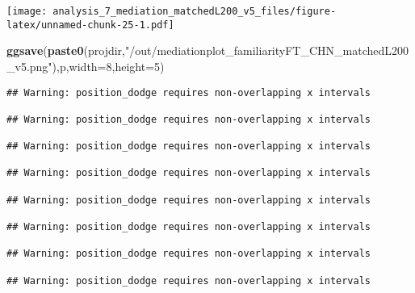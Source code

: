 \documentclass[
]{article}
\newenvironment{Shaded}{\begin{snugshade}}{\end{snugshade}}
\newcommand{\DataTypeTok}[1]{\textcolor[rgb]{0.13,0.29,0.53}{#1}}
\newcommand{\DecValTok}[1]{\textcolor[rgb]{0.00,0.00,0.81}{#1}}
\newcommand{\KeywordTok}[1]{\textcolor[rgb]{0.13,0.29,0.53}{\textbf{#1}}}
\newcommand{\NormalTok}[1]{#1}
\newcommand{\StringTok}[1]{\textcolor[rgb]{0.31,0.60,0.02}{#1}}
\begin{document}
\texttt{[image: analysis\_7\_mediation\_matchedL200\_v5\_files/figure-latex/unnamed-chunk-25-1.pdf]}

\begin{Shaded}
\begin{Highlighting}[]
\KeywordTok{ggsave}\NormalTok{(}\KeywordTok{paste0}\NormalTok{(projdir,}\StringTok{"/out/mediationplot_familiarityFT_CHN_matchedL200_v5.png"}\NormalTok{),p,}\DataTypeTok{width=}\DecValTok{8}\NormalTok{,}\DataTypeTok{height=}\DecValTok{5}\NormalTok{)}
\end{Highlighting}
\end{Shaded}

\begin{verbatim}
## Warning: position_dodge requires non-overlapping x intervals

## Warning: position_dodge requires non-overlapping x intervals

## Warning: position_dodge requires non-overlapping x intervals

## Warning: position_dodge requires non-overlapping x intervals

## Warning: position_dodge requires non-overlapping x intervals

## Warning: position_dodge requires non-overlapping x intervals

## Warning: position_dodge requires non-overlapping x intervals

## Warning: position_dodge requires non-overlapping x intervals
\end{verbatim}
\end{document}
